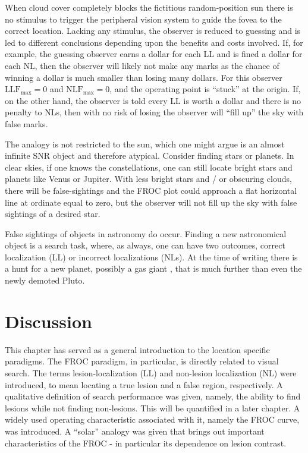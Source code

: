 \documentclass[
]{book}
\begin{document}
When cloud cover completely blocks the fictitious random-position sun there is no stimulus to trigger the peripheral vision system to guide the fovea to the correct location. Lacking any stimulus, the observer is reduced to guessing and is led to different conclusions depending upon the benefits and costs involved. If, for example, the guessing observer earns a dollar for each LL and is fined a dollar for each NL, then the observer will likely not make any marks as the chance of winning a dollar is much smaller than losing many dollars. For this observer \(\text{LLF}_{\text{max}} = 0\) and \(\text{NLF}_{\text{max}} = 0\), and the operating point is ``stuck'' at the origin. If, on the other hand, the observer is told every LL is worth a dollar and there is no penalty to NLs, then with no risk of losing the observer will ``fill up'' the sky with false marks.

The analogy is not restricted to the sun, which one might argue is an almost infinite SNR object and therefore atypical. Consider finding stars or planets. In clear skies, if one knows the constellations, one can still locate bright stars and planets like Venus or Jupiter. With less bright stars and / or obscuring clouds, there will be false-sightings and the FROC plot could approach a flat horizontal line at ordinate equal to zero, but the observer will not fill up the sky with false sightings of a desired star.

False sightings of objects in astronomy do occur. Finding a new astronomical object is a search task, where, as always, one can have two outcomes, correct localization (LL) or incorrect localizations (NLs). At the time of writing there is a hunt for a new planet, possibly a gas giant , that is much further than even the newly demoted Pluto.

\hypertarget{froc-paradigm-discussion}{%
\section{Discussion}\label{froc-paradigm-discussion}}

This chapter has served as a general introduction to the location specific paradigms. The FROC paradigm, in particular, is directly related to visual search. The terms lesion-localization (LL) and non-lesion localization (NL) were introduced, to mean locating a true lesion and a false region, respectively. A qualitative definition of search performance was given, namely, the ability to find lesions while not finding non-lesions. This will be quantified in a later chapter. A widely used operating characteristic associated with it, namely the FROC curve, was introduced. A ``solar'' analogy was given that brings out important characteristics of the FROC - in particular its dependence on lesion contrast.
\end{document}
